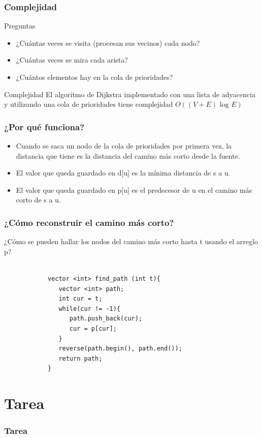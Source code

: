\documentclass{beamer}
\begin{document}
	\begin{frame}
		\frametitle{Complejidad}
		\begin{alertblock}{Preguntas}
			\begin{itemize}
				\item ¿Cuántas veces se visita (procesan sus vecinos) cada nodo?
				\item ¿Cuántas veces se mira cada arista?
				\item ¿Cuántos elementos hay en la cola de prioridades?
			\end{itemize}
		\end{alertblock}
		\pause
		\begin{block}{Complejidad}
			El algoritmo de Dijkstra implementado con una lista de adyacencia y utilizando una cola de prioridades tiene complejidad $O((V+E) \text{ log } E)$
		\end{block}
	\end{frame}
	
	\begin{frame}
		\frametitle{¿Por qué funciona?}
		\begin{itemize}
			\item Cuando se saca un nodo de la cola de prioridades por primera vez, la distancia que tiene es la distancia del camino más corto desde la fuente.
			\item El valor que queda guardado en d[u] es la mínima distancia de s a u.
			\item El valor que queda guardado en p[u] es el predecesor de u en el camino más corto de s a u.
		\end{itemize}
	\end{frame}
	
	\begin{frame}[fragile]
		\frametitle{¿Cómo reconstruir el camino más corto?}
		¿Cómo se pueden hallar los nodos del camino más corto hasta t usando el arreglo p? \\ \quad \\
		\pause
		\begin{lstlisting}
			vector <int> find_path (int t){
			   vector <int> path;
			   int cur = t;
			   while(cur != -1){
			      path.push_back(cur);
			      cur = p[cur];
			   }
			   reverse(path.begin(), path.end());
			   return path;
			}
		\end{lstlisting}
	\end{frame}

\section{Tarea}
	\begin{frame}
		\frametitle{Tarea}
		
	\end{frame}
\end{document}
